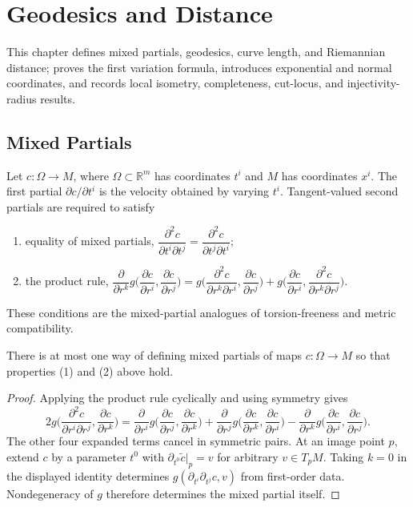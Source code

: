 \chapter{Geodesics and Distance}
\label{chap:pet-geodesics-and-distance}

This chapter defines mixed partials, geodesics, curve length, and Riemannian distance;
proves the first variation formula, introduces exponential and normal coordinates,
and records local isometry, completeness, cut-locus, and injectivity-radius results.

\section{Mixed Partials}

Let $c:\Omega\to M$, where $\Omega\subset\mathbb R^m$ has coordinates $t^i$ and
$M$ has coordinates $x^i$.  The first partial $\partial c/\partial t^i$ is the
velocity obtained by varying $t^i$.  Tangent-valued second partials are required
to satisfy
\begin{enumerate}
\item[(1)] equality of mixed partials,
$\dfrac{\partial^2c}{\partial t^i\partial t^j}=\dfrac{\partial^2c}{\partial t^j\partial t^i}$;
\item[(2)] the product rule,
$\dfrac{\partial}{\partial r^k}g\Big(\dfrac{\partial c}{\partial r^i},\dfrac{\partial c}{\partial r^j}\Big)
=g\Big(\dfrac{\partial^2c}{\partial r^k\partial r^i},\dfrac{\partial c}{\partial r^j}\Big)
+g\Big(\dfrac{\partial c}{\partial r^i},\dfrac{\partial^2c}{\partial r^k\partial r^j}\Big)$.
\end{enumerate}
These conditions are the mixed-partial analogues of torsion-freeness and metric
compatibility.

\begin{lemma}
  \label{lem:pet-ch5-mixed-partials-uniqueness}


  There is at most one way of defining mixed partials of maps $c:\Omega\to M$ so
  that properties (1) and (2) above hold.
\end{lemma}
\begin{proof}

  \sketch
  Applying the product rule cyclically and using symmetry gives
  \[
    2g\Big(\frac{\partial^2c}{\partial r^i\partial r^j},\frac{\partial c}{\partial r^k}\Big)
    =\frac{\partial}{\partial r^i}g\Big(\frac{\partial c}{\partial r^j},\frac{\partial c}{\partial r^k}\Big)
    +\frac{\partial}{\partial r^j}g\Big(\frac{\partial c}{\partial r^k},\frac{\partial c}{\partial r^i}\Big)
    -\frac{\partial}{\partial r^k}g\Big(\frac{\partial c}{\partial r^i},\frac{\partial c}{\partial r^j}\Big).
  \]
  The other four expanded terms cancel in symmetric pairs.  At an image point
  $p$, extend $c$ by a parameter $t^0$ with
  $\partial_{t^0}\tilde c|_p=v$ for arbitrary $v\in T_pM$.  Taking $k=0$ in the
  displayed identity determines
  $g(\partial_{t^i}\partial_{t^j}c,v)$ from first-order data.  Nondegeneracy of
  $g$ therefore determines the mixed partial itself.
\end{proof}

